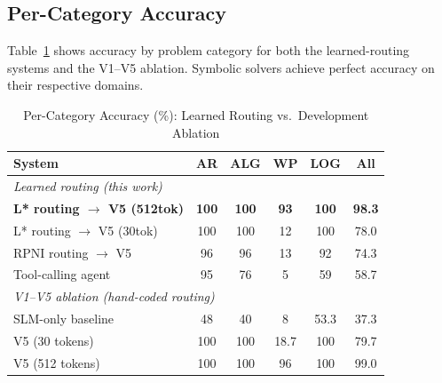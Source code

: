 \documentclass[journal]{IEEEtai}
\begin{document}
\subsection{Per-Category Accuracy}

Table~\ref{tab:per_category} shows accuracy by problem category for both the learned-routing systems and the V1--V5 ablation. Symbolic solvers achieve perfect accuracy on their respective domains.


\begin{table}[t]
\centering
\caption{Per-Category Accuracy (\%): Learned Routing vs.\ Development Ablation}
\label{tab:per_category}
\begin{tabular}{lccccc}
\hline
\textbf{System} & \textbf{AR} & \textbf{ALG} & \textbf{WP} & \textbf{LOG} & \textbf{All} \\
\hline
\multicolumn{6}{l}{\textit{Learned routing (this work)}} \\
\textbf{L* routing $\to$ V5 (512tok)} & \textbf{100} & \textbf{100} & \textbf{93} & \textbf{100} & \textbf{98.3} \\
L* routing $\to$ V5 (30tok) & 100 & 100 & 12 & 100 & 78.0 \\
RPNI routing $\to$ V5 & 96 & 96 & 13 & 92 & 74.3 \\
Tool-calling agent & 95 & 76 & 5 & 59 & 58.7 \\
\hline
\multicolumn{6}{l}{\textit{V1--V5 ablation (hand-coded routing)}} \\
SLM-only baseline & 48 & 40 & 8 & 53.3 & 37.3 \\
V5 (30 tokens) & 100 & 100 & 18.7 & 100 & 79.7 \\
V5 (512 tokens) & 100 & 100 & 96 & 100 & 99.0 \\
\hline
\end{tabular}
\end{table}
\end{document}
